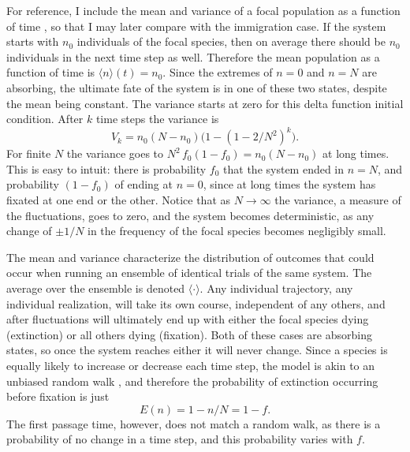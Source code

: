 For reference, I include the mean and variance of a focal population as a function of time \cite{Moran1962,Kimura1964,McKane2003}, so that I may later compare with the immigration case. 
If the system starts with $n_0$ individuals of the focal species, then on average there should be $n_0$ individuals in the next time step as well.
Therefore the mean population as a function of time is $\langle n\rangle(t) = n_0$. 
Since the extremes of $n=0$ and $n=N$ are absorbing, the ultimate fate of the system is in one of these two states, despite the mean being constant. 
The variance starts at zero for this delta function initial condition. 
After $k$ time steps the variance is
\begin{equation*}
V_k = n_0(N-n_0) \big(1-(1-2/N^2)^k\big).
\end{equation*}
For finite $N$ the variance goes to $N^2 \, f_0(1-f_0)=n_0(N-n_0)$ at long times. 
This is easy to intuit: there is probability $f_0$ that the system ended in $n=N$, and probability $(1-f_0)$ of ending at $n=0$, since at long times the system has fixated at one end or the other. 
Notice that as $N\rightarrow\infty$ the variance, a measure of the fluctuations, goes to zero, and the system becomes deterministic, as any change of $\pm 1/N$ in the frequency of the focal species becomes negligibly small. %

The mean and variance characterize the distribution of outcomes that could occur when running an ensemble of identical trials of the same system. 
The average over the ensemble is denoted $\langle \cdot \rangle$. 
Any individual trajectory, any individual realization, will take its own course, independent of any others, and after fluctuations will ultimately end up with either the focal species dying (extinction) or all others dying (fixation). 
Both of these cases are absorbing states, so once the system reaches either it will never change.
Since a species is equally likely to increase or decrease each time step, the model is akin to an unbiased random walk \cite{Gardiner2004}, and therefore the probability of extinction occurring before fixation is just
\begin{equation}
E(n) = 1-n/N = 1-f.
\end{equation}
The first passage time, however, does not match a random walk, as there is a probability of no change in a time step, and this probability varies with $f$.

